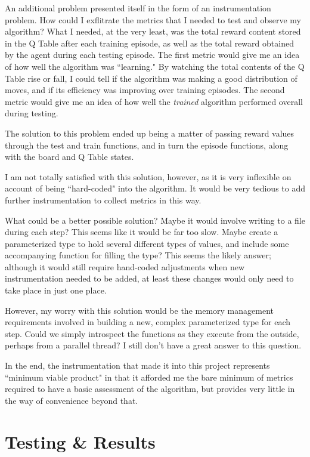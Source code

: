 \documentclass[12pt,a4paper]{article}
\begin{document}
		\par An additional problem presented itself in the form of an instrumentation problem. How could I exflitrate the metrics that I needed to test and observe my algorithm? What I needed, at the very least, was the total reward content stored in the Q Table after each training episode, as well as the total reward obtained by the agent during each testing episode. The first metric would give me an idea of how well the algorithm was ``learning." By watching the total contents of the Q Table rise or fall, I could tell if the algorithm was making a good distribution of moves, and if its efficiency was improving over training episodes. The second metric would give me an idea of how well the \textit{trained} algorithm performed overall during testing.
		\par The solution to this problem ended up being a matter of passing reward values through the test and train functions, and in turn the episode functions, along with the board and Q Table states. 
		\par I am not totally satisfied with this solution, however, as it is very inflexible on account of being ``hard-coded" into the algorithm. It would be very tedious to add further instrumentation to collect metrics in this way.
		\par What could be a better possible solution? Maybe it would involve writing to a file during each step? This seems like it would be far too slow. Maybe create a parameterized type to hold several different types of values, and include some accompanying function for filling the type? This seems the likely answer; although it would still require hand-coded adjustments when new instrumentation needed to be added, at least these changes would only need to take place in just one place. 
		\par However, my worry with this solution would be the memory management requirements involved in building a new, complex parameterized type for each step. Could we simply introspect the functions as they execute from the outside, perhaps from a parallel thread? I still don't have a great answer to this question.
		\par In the end, the instrumentation that made it into this project represents ``minimum viable product" in that it afforded me the bare minimum of metrics required to have a basic assessment of the algorithm, but provides very little in the way of convenience beyond that. 
		
			
	\section{Testing \& Results}\label{testingresults}
	
\end{document}
